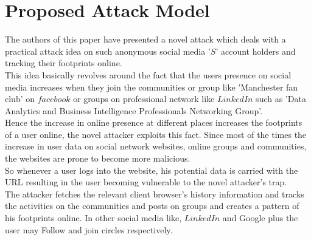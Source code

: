 \documentclass{article}
\begin{document}
\section*{Proposed Attack Model}
The authors of this paper have presented a novel attack which deals with a practical attack idea on such anonymous social media '$S$' account holders and tracking their footprints online.\\
This idea basically revolves around the fact that the users presence on social media increases when they join the communities or group like 'Manchester fan club' on $facebook$ or groups on professional network like $LinkedIn$ such as 'Data Analytics and Business Intelligence Professionals Networking Group'.\\
Hence the increase in online presence at different places increases the footprints of a user online, the novel attacker exploits this fact. Since most of the times the increase in user data on social network websites, online groups and communities, the websites are prone to become more malicious.\\
So whenever a user logs into the website, his potential data is carried with the URL resulting in the user becoming vulnerable to the novel attacker's trap.\\
The attacker fetches the relevant client browser's history information and tracks the activities on the communities and posts on groups and creates a pattern of his footprints online. In other social media like, $LinkedIn$ and Google plus the user may Follow and join circles respectively.\\
\end{document}
